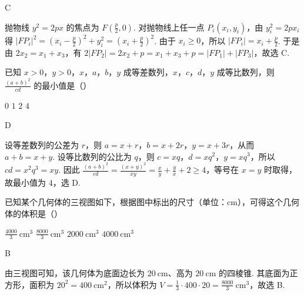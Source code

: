 \begin{answer}
C
\end{answer}

\begin{solution}
抛物线 \(y^2=2px\) 的焦点为 \(F(\frac{p}{2},0)\). 对抛物线上任一点 \(P_i(x_i,y_i)\)，由 \(y_i^2=2px_i\) 得
\(\lvert FP_i\rvert^2=(x_i-\frac{p}{2})^2+y_i^2=(x_i+\frac{p}{2})^2\). 由于 \(x_i\geqslant0\)，所以 \(\lvert FP_i\rvert=x_i+\frac{p}{2}\). 于是由 \(2x_2=x_1+x_3\)，有
\(2\lvert FP_2\rvert=2x_2+p=x_1+x_3+p=\lvert FP_1\rvert+\lvert FP_3\rvert\)，故选 C.
\end{solution}

\begin{problem}
已知 \(x > 0\)，\(y > 0\)，\(x\)，\(a\)，\(b\)，\(y\) 成等差数列，\(x\)，\(c\)，\(d\)，\(y\) 成等比数列，则 \(\frac{(a + b)^2}{cd}\) 的最小值是（\quad）

\choices
    {\(0\)}
    {\(1\)}
    {\(2\)}
    {\(4\)}
\end{problem}

\begin{answer}
D
\end{answer}

\begin{solution}
设等差数列的公差为 \(r\)，则 \(a=x+r\)，\(b=x+2r\)，\(y=x+3r\)，从而 \(a+b=x+y\). 设等比数列的公比为 \(q\)，则 \(c=xq\)，\(d=xq^2\)，\(y=xq^3\)，所以 \(cd=x^2q^3=xy\). 因此
\(\frac{(a+b)^2}{cd}=\frac{(x+y)^2}{xy}=\frac{x}{y}+\frac{y}{x}+2\geqslant4\)，等号在 \(x=y\) 时取得，故最小值为 \(4\)，选 D.
\end{solution}

\begin{problem}
已知某个几何体的三视图如下，根据图中标出的尺寸（单位：\(\mathrm{cm}\)），可得这个几何体的体积是（\quad）


\choices
    {\(\frac{4000}{3}\mathrm{~cm}^{3}\)}
    {\(\frac{8000}{3}\mathrm{~cm}^{3}\)}
    {\(2000\mathrm{~cm}^{3}\)}
    {\(4000\mathrm{~cm}^{3}\)}
\end{problem}

\begin{answer}
B
\end{answer}

\begin{solution}
由三视图可知，该几何体为底面边长为 \(20\mathrm{~cm}\)、高为 \(20\mathrm{~cm}\) 的四棱锥. 其底面为正方形，面积为 \(20^2=400\mathrm{~cm}^2\)，所以体积为
\(V=\frac{1}{3}\cdot400\cdot20=\frac{8000}{3}\mathrm{~cm}^3\)，故选 B.
\end{solution}

